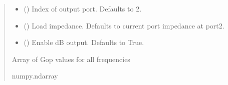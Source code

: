 \documentclass[letterpaper,10pt,english]{sphinxmanual}
\begin{document}
\begin{fulllineitems}
\begin{fulllineitems}
\begin{quote}
\begin{description}
\begin{itemize}
\item {} 
\sphinxAtStartPar
{} (\sphinxstyleliteralemphasis{\sphinxupquote{, }}) \textendash{} Index of output port. Defaults to 2.

\item {} 
\sphinxAtStartPar
{} (\sphinxstyleliteralemphasis{\sphinxupquote{, }}) \textendash{} Load impedance. Defaults to current port impedance at port2.

\item {} 
\sphinxAtStartPar
{} (\sphinxstyleliteralemphasis{\sphinxupquote{, }}) \textendash{} Enable dB output. Defaults to True.

\end{itemize}

\sphinxAtStartPar
Array of Gop values for all frequencies

\sphinxAtStartPar
numpy.ndarray

\end{description}\end{quote}

\end{fulllineitems}



\end{fulllineitems}
\end{document}
